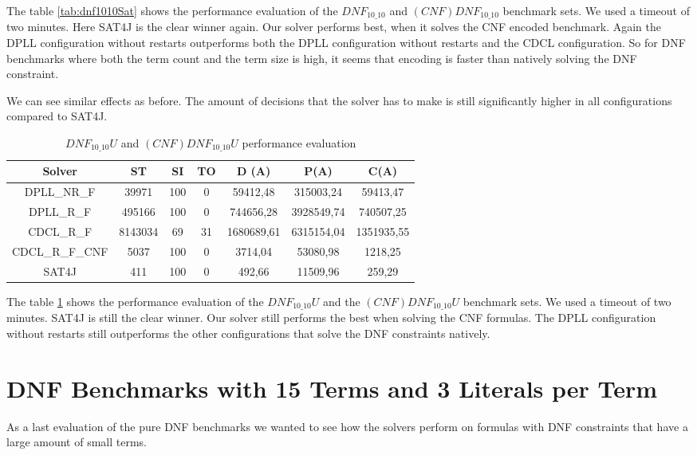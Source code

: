 The table \ref{tab:dnf1010Sat} shows the performance evaluation of the $DNF_{10\_10}$ and $(CNF)DNF_{10\_10}$ benchmark sets. We used a timeout of two minutes. Here SAT4J is the clear winner again. Our solver performs best, when it solves the CNF encoded benchmark. Again the DPLL configuration without restarts outperforms both the DPLL configuration without restarts and the CDCL configuration. So for DNF benchmarks where both the term count and the term size is high, it seems that encoding is faster than natively solving the DNF constraint.

We can see similar effects as before. The amount of decisions that the solver has to make is still significantly higher in all configurations compared to SAT4J.

\begin{table}[!htb]
\centering
\caption{$DNF_{10\_10}U$ and $(CNF)DNF_{10\_10}U$ performance evaluation}
\label{tab:dnf1010Unsat}
\begin{tabular}{|c|c|c|c|c|c|c|}
\hline
Solver & ST & SI & TO & D (A) & P(A) & C(A)\\
\hline
DPLL\_NR\_F & 39971 & 100 & 0 & 59412,48 & 315003,24 & 59413,47 \\
\hline
DPLL\_R\_F & 495166 & 100 & 0 & 744656,28 & 3928549,74 & 740507,25 \\
\hline
CDCL\_R\_F & 8143034 & 69 & 31 & 1680689,61 & 6315154,04 & 1351935,55 \\
\hline
CDCL\_R\_F\_CNF & 5037 & 100 & 0 & 3714,04 & 53080,98 & 1218,25 \\
\hline
SAT4J & 411 & 100 & 0 & 492,66 & 11509,96 & 259,29 \\
\hline
\end{tabular}
\end{table}

The table \ref{tab:dnf1010Unsat} shows the performance evaluation of the $DNF_{10\_10}U$ and the $(CNF)DNF_{10\_10}U$ benchmark sets. We used a timeout of two minutes. SAT4J is still the clear winner. Our solver still performs the best when solving the CNF formulas. The DPLL configuration without restarts still outperforms the other configurations that solve the DNF constraints natively.

\section{DNF Benchmarks with 15 Terms and 3 Literals per Term}

As a last evaluation of the pure DNF benchmarks we wanted to see how the solvers perform on formulas with DNF constraints that have a large amount of small terms.


